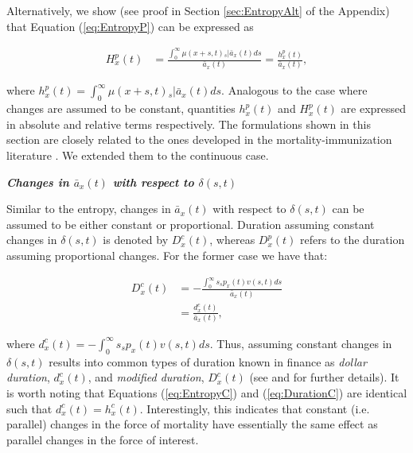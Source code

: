\documentclass[12pt]{article}
\begin{document}
Alternatively, we show (see proof in Section \ref{sec:EntropyAlt} of the Appendix) that Equation (\ref{eq:EntropyP}) can be expressed as

\begin{equation} \label{eq:EntropyP2}
\begin{split}
{H}^{p}_{x}(t) &=  \frac{\int_0^\infty \mu(x+s,t)   {}_s|\bar{a}_x(t) ds}{\bar{a}_x(t)} =  \frac{{h}^{p}_{x}(t)}{\bar{a}_x(t)}, 
\end{split}
\end{equation}

where ${h}^{p}_{x}(t)=\int_0^\infty \mu(x+s,t)   {}_s|\bar{a}_x(t) ds$. Analogous to the case where changes are assumed to be constant, quantities ${h}^{p}_{x}(t)$ and ${H}^{p}_{x}(t)$ are expressed in absolute and relative terms respectively. The formulations shown in this section are closely related to the ones developed in the mortality-immunization literature \citep{Tsai2013a,Lin2020}. We extended them to the continuous case.

 
 

\textbf{\textit{{Changes in $\bar{a}_x(t)$ with respect to $\delta(s,t)$}}}

 Similar to the entropy, changes in $\bar{a}_x(t)$ with respect to $\delta(s,t)$ can be assumed to be either constant or proportional. Duration assuming constant changes in $\delta(s,t)$ is denoted by ${D}^{c}_{x}(t)$, whereas ${D}^{p}_{x}(t)$ refers to the duration assuming proportional changes. For the former case we have that:



\begin{equation}\label{eq:DurationC}
\begin{split}
{D}^{c}_x(t)&= -\frac{\int_0^\infty s {}_sp_x(t) {v}(s,t)ds}{\bar{a}_x(t)} \\
&= \frac{{d}^{c}_x(t)}{\bar{a}_x(t)},
\end{split}
\end{equation}

where ${d}^{c}_x(t)=-\int_0^\infty s {}_sp_x(t) {v}(s,t)ds$. Thus, assuming constant changes in $\delta(s,t)$ results into common types of duration known in finance as \textit{dollar duration}, ${d}^{c}_x(t)$, and \textit{modified duration}, ${D}^{c}_x(t)$ (see \citet{Milevsky2012} and \citet{Tsai2013a} for further details). It is worth noting that Equations (\ref{eq:EntropyC}) and (\ref{eq:DurationC}) are identical such that ${d}^{c}_x(t)={h}^{c}_{x}(t)$. Interestingly, this indicates that constant (i.e. parallel) changes in the force of mortality have essentially the same effect as parallel changes in the force of interest.
\end{document}
